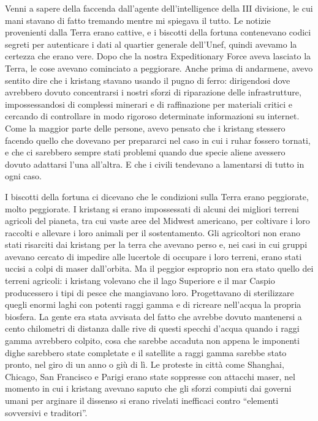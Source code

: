 Venni a sapere della faccenda dall'agente dell'intelligence della III
divisione, le cui mani stavano di fatto tremando mentre mi spiegava il
tutto. Le notizie provenienti dalla Terra erano cattive, e i biscotti
della fortuna contenevano codici segreti per autenticare i dati al
quartier generale dell'Unef, quindi avevamo la certezza che erano vere.
Dopo che la nostra Expeditionary Force aveva lasciato la Terra, le cose
avevano cominciato a peggiorare. Anche prima di andarmene, avevo sentito
dire che i kristang stavano usando il pugno di ferro: dirigendosi dove
avrebbero dovuto concentrarsi i nostri sforzi di riparazione delle
infrastrutture, impossessandosi di complessi minerari e di raffinazione
per materiali critici e cercando di controllare in modo rigoroso
determinate informazioni su internet. Come la maggior parte delle
persone, avevo pensato che i kristang stessero facendo quello che
dovevano per prepararci nel caso in cui i ruhar fossero tornati, e che
ci sarebbero sempre stati problemi quando due specie aliene avessero
dovuto adattarsi l'una all'altra. E che i civili tendevano a lamentarsi
di tutto in ogni caso.

I biscotti della fortuna ci dicevano che le condizioni sulla Terra erano
peggiorate, molto peggiorate. I kristang si erano impossessati di alcuni
dei migliori terreni agricoli del pianeta, tra cui vaste aree del
Midwest americano, per coltivare i loro raccolti e allevare i loro
animali per il sostentamento. Gli agricoltori non erano stati risarciti
dai kristang per la terra che avevano perso e, nei casi in cui gruppi
avevano cercato di impedire alle lucertole di occupare i loro terreni,
erano stati uccisi a colpi di maser dall'orbita. Ma il peggior esproprio
non era stato quello dei terreni agricoli: i kristang volevano che il
lago Superiore e il mar Caspio producessero i tipi di pesce che
mangiavano loro. Progettavano di sterilizzare quegli enormi laghi con
potenti raggi gamma e di ricreare nell'acqua la propria biosfera. La
gente era stata avvisata del fatto che avrebbe dovuto mantenersi a cento
chilometri di distanza dalle rive di questi specchi d'acqua quando i
raggi gamma avrebbero colpito, cosa che sarebbe accaduta non appena le
imponenti dighe sarebbero state completate e il satellite a raggi gamma
sarebbe stato pronto, nel giro di un anno o giù di lì. Le proteste in
città come Shanghai, Chicago, San Francisco e Parigi erano state
soppresse con attacchi maser, nel momento in cui i kristang avevano
saputo che gli sforzi compiuti dai governi umani per arginare il
dissenso si erano rivelati inefficaci contro ``elementi sovversivi e
traditori''.

